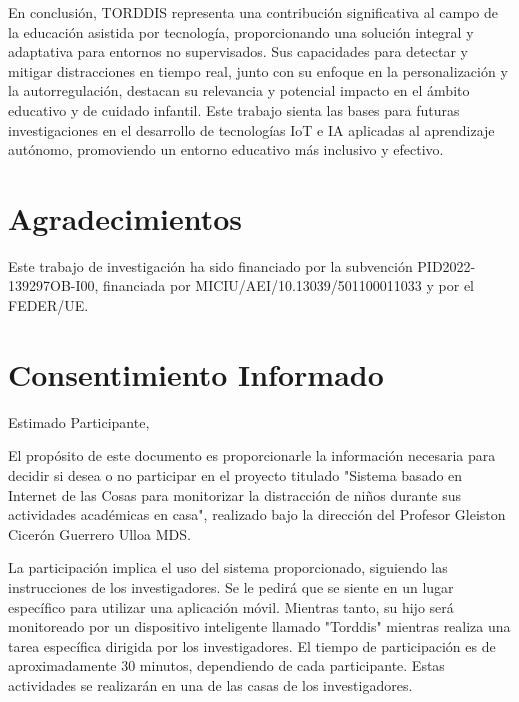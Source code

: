 \documentclass[a4paper,fleqn]{cas-sc}
\begin{document}
		En conclusión, TORDDIS representa una contribución significativa al campo de la educación asistida por tecnología, proporcionando una solución integral y adaptativa para entornos no supervisados. Sus capacidades para detectar y mitigar distracciones en tiempo real, junto con su enfoque en la personalización y la autorregulación, destacan su relevancia y potencial impacto en el ámbito educativo y de cuidado infantil. Este trabajo sienta las bases para futuras investigaciones en el desarrollo de tecnologías IoT e IA aplicadas al aprendizaje autónomo, promoviendo un entorno educativo más inclusivo y efectivo.
						
	\section*{Agradecimientos}
	
	Este trabajo de investigación ha sido financiado por la subvención PID2022-139297OB-I00, financiada por MICIU/AEI/10.13039/501100011033 y por el FEDER/UE.
	
	\printcredits
	
	
	
	
	
	\clearpage
	
	\appendix
	\section{Consentimiento Informado} \label{Appendix:InformedConsent}
	Estimado Participante,
	
	El propósito de este documento es proporcionarle la información necesaria para decidir si desea o no participar en el proyecto titulado "Sistema basado en Internet de las Cosas para monitorizar la distracción de niños durante sus actividades académicas en casa", realizado bajo la dirección del Profesor Gleiston Cicerón Guerrero Ulloa MDS.
	
	La participación implica el uso del sistema proporcionado, siguiendo las instrucciones de los investigadores. Se le pedirá que se siente en un lugar específico para utilizar una aplicación móvil. Mientras tanto, su hijo será monitoreado por un dispositivo inteligente llamado "Torddis" mientras realiza una tarea específica dirigida por los investigadores. El tiempo de participación es de aproximadamente 30 minutos, dependiendo de cada participante. Estas actividades se realizarán en una de las casas de los investigadores.
	
\end{document}
